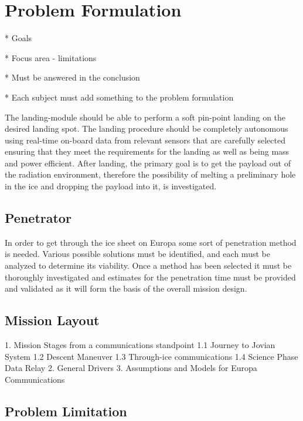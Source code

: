 \chapter{Problem Formulation}

* Goals

* Focus area - limitations

* Must be answered in the conclusion

* Each subject must add something to the problem formulation

The landing-module should be able to perform a soft pin-point landing on the desired landing spot. The landing procedure should be completely autonomous using real-time on-board data from relevant sensors that are carefully selected ensuring that they meet the requirements for the landing as well as being mass and power efficient. After landing, the primary goal is to get the payload out of the radiation environment, therefore the possibility of melting a preliminary hole in the ice and dropping the payload into it, is investigated.

\section{Penetrator}
In order to get through the ice sheet on Europa some sort of penetration method is needed. Various possible solutions must be identified, and each must be analyzed to determine its viability. Once a method has been selected it must be thoroughly investigated and estimates for the penetration time must be provided and validated as it will form the basis of the overall mission design.

\section{Mission Layout}

%



1. Mission Stages from a communications standpoint
    1.1 Journey to Jovian System
    1.2 Descent Maneuver
    1.3 Through-ice communications
    1.4 Science Phase Data Relay
2. General Drivers
3. Assumptions and Models for Europa Communications

\section{Problem Limitation}
